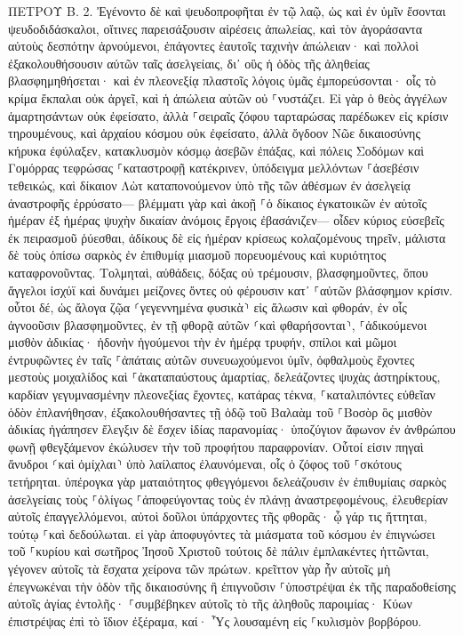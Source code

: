 \documentclass[twoside, 9pt]{extreport}
\begin{document}
ΠΕΤΡΟΥ Β.
2.
Ἐγένοντο δὲ καὶ ψευδοπροφῆται ἐν τῷ λαῷ, ὡς καὶ ἐν ὑμῖν ἔσονται ψευδοδιδάσκαλοι, οἵτινες παρεισάξουσιν αἱρέσεις ἀπωλείας, καὶ τὸν ἀγοράσαντα αὐτοὺς δεσπότην ἀρνούμενοι, ἐπάγοντες ἑαυτοῖς ταχινὴν ἀπώλειαν· 
καὶ πολλοὶ ἐξακολουθήσουσιν αὐτῶν ταῖς ἀσελγείαις, δι᾽ οὓς ἡ ὁδὸς τῆς ἀληθείας βλασφημηθήσεται· 
καὶ ἐν πλεονεξίᾳ πλαστοῖς λόγοις ὑμᾶς ἐμπορεύσονται· οἷς τὸ κρίμα ἔκπαλαι οὐκ ἀργεῖ, καὶ ἡ ἀπώλεια αὐτῶν οὐ ⸀νυστάζει. 
Εἰ γὰρ ὁ θεὸς ἀγγέλων ἁμαρτησάντων οὐκ ἐφείσατο, ἀλλὰ ⸀σειραῖς ζόφου ταρταρώσας παρέδωκεν εἰς κρίσιν τηρουμένους, 
καὶ ἀρχαίου κόσμου οὐκ ἐφείσατο, ἀλλὰ ὄγδοον Νῶε δικαιοσύνης κήρυκα ἐφύλαξεν, κατακλυσμὸν κόσμῳ ἀσεβῶν ἐπάξας, 
καὶ πόλεις Σοδόμων καὶ Γομόρρας τεφρώσας ⸀καταστροφῇ κατέκρινεν, ὑπόδειγμα μελλόντων ⸀ἀσεβέσιν τεθεικώς, 
καὶ δίκαιον Λὼτ καταπονούμενον ὑπὸ τῆς τῶν ἀθέσμων ἐν ἀσελγείᾳ ἀναστροφῆς ἐρρύσατο— 
βλέμματι γὰρ καὶ ἀκοῇ ⸀ὁ δίκαιος ἐγκατοικῶν ἐν αὐτοῖς ἡμέραν ἐξ ἡμέρας ψυχὴν δικαίαν ἀνόμοις ἔργοις ἐβασάνιζεν— 
οἶδεν κύριος εὐσεβεῖς ἐκ πειρασμοῦ ῥύεσθαι, ἀδίκους δὲ εἰς ἡμέραν κρίσεως κολαζομένους τηρεῖν, 
μάλιστα δὲ τοὺς ὀπίσω σαρκὸς ἐν ἐπιθυμίᾳ μιασμοῦ πορευομένους καὶ κυριότητος καταφρονοῦντας. Τολμηταὶ, αὐθάδεις, δόξας οὐ τρέμουσιν, βλασφημοῦντες, 
ὅπου ἄγγελοι ἰσχύϊ καὶ δυνάμει μείζονες ὄντες οὐ φέρουσιν κατ᾽ ⸀αὐτῶν βλάσφημον κρίσιν. 
οὗτοι δέ, ὡς ἄλογα ζῷα ⸂γεγεννημένα φυσικὰ⸃ εἰς ἅλωσιν καὶ φθοράν, ἐν οἷς ἀγνοοῦσιν βλασφημοῦντες, ἐν τῇ φθορᾷ αὐτῶν ⸂καὶ φθαρήσονται⸃, 
⸀ἀδικούμενοι μισθὸν ἀδικίας· ἡδονὴν ἡγούμενοι τὴν ἐν ἡμέρᾳ τρυφήν, σπίλοι καὶ μῶμοι ἐντρυφῶντες ἐν ταῖς ⸀ἀπάταις αὐτῶν συνευωχούμενοι ὑμῖν, 
ὀφθαλμοὺς ἔχοντες μεστοὺς μοιχαλίδος καὶ ⸀ἀκαταπαύστους ἁμαρτίας, δελεάζοντες ψυχὰς ἀστηρίκτους, καρδίαν γεγυμνασμένην πλεονεξίας ἔχοντες, κατάρας τέκνα, 
⸀καταλιπόντες εὐθεῖαν ὁδὸν ἐπλανήθησαν, ἐξακολουθήσαντες τῇ ὁδῷ τοῦ Βαλαὰμ τοῦ ⸀Βοσὸρ ὃς μισθὸν ἀδικίας ἠγάπησεν 
ἔλεγξιν δὲ ἔσχεν ἰδίας παρανομίας· ὑποζύγιον ἄφωνον ἐν ἀνθρώπου φωνῇ φθεγξάμενον ἐκώλυσεν τὴν τοῦ προφήτου παραφρονίαν. 
Οὗτοί εἰσιν πηγαὶ ἄνυδροι ⸂καὶ ὁμίχλαι⸃ ὑπὸ λαίλαπος ἐλαυνόμεναι, οἷς ὁ ζόφος τοῦ ⸀σκότους τετήρηται. 
ὑπέρογκα γὰρ ματαιότητος φθεγγόμενοι δελεάζουσιν ἐν ἐπιθυμίαις σαρκὸς ἀσελγείαις τοὺς ⸀ὀλίγως ⸀ἀποφεύγοντας τοὺς ἐν πλάνῃ ἀναστρεφομένους, 
ἐλευθερίαν αὐτοῖς ἐπαγγελλόμενοι, αὐτοὶ δοῦλοι ὑπάρχοντες τῆς φθορᾶς· ᾧ γάρ τις ἥττηται, τούτῳ ⸀καὶ δεδούλωται. 
εἰ γὰρ ἀποφυγόντες τὰ μιάσματα τοῦ κόσμου ἐν ἐπιγνώσει τοῦ ⸀κυρίου καὶ σωτῆρος Ἰησοῦ Χριστοῦ τούτοις δὲ πάλιν ἐμπλακέντες ἡττῶνται, γέγονεν αὐτοῖς τὰ ἔσχατα χείρονα τῶν πρώτων. 
κρεῖττον γὰρ ἦν αὐτοῖς μὴ ἐπεγνωκέναι τὴν ὁδὸν τῆς δικαιοσύνης ἢ ἐπιγνοῦσιν ⸀ὑποστρέψαι ἐκ τῆς παραδοθείσης αὐτοῖς ἁγίας ἐντολῆς· 
⸀συμβέβηκεν αὐτοῖς τὸ τῆς ἀληθοῦς παροιμίας· Κύων ἐπιστρέψας ἐπὶ τὸ ἴδιον ἐξέραμα, καί· Ὗς λουσαμένη εἰς ⸀κυλισμὸν βορβόρου. 
\end{document}
